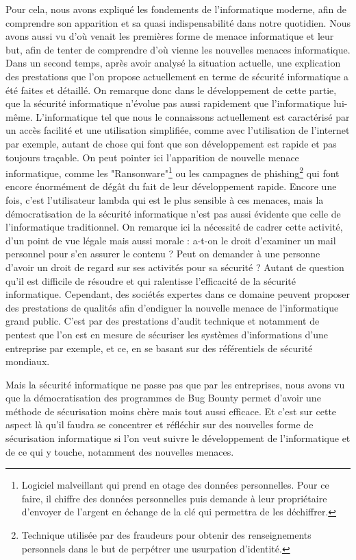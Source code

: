 \documentclass[a4paper]{memoir}
\begin{document}
Pour cela, nous avons expliqué les fondements de l'informatique moderne, afin de comprendre son apparition et sa quasi indispensabilité dans notre quotidien. Nous avons aussi vu d'où venait les premières forme de menace informatique et leur but, afin de tenter de comprendre d'où vienne les nouvelles menaces informatique.
Dans un second temps, après avoir analysé la situation actuelle, une explication des prestations que l'on propose actuellement en terme de sécurité informatique a été faites et détaillé. 
On remarque donc dans le développement de cette partie, que la sécurité informatique n'évolue pas aussi rapidement que l'informatique lui-même. L'informatique tel que nous le connaissons actuellement est caractérisé par un accès facilité et une utilisation simplifiée, comme avec l'utilisation de l'internet par exemple, autant de chose qui font que son développement est rapide et pas toujours traçable. On peut pointer ici l'apparition de nouvelle menace informatique, comme les "Ransonware"\footnote{Logiciel malveillant qui prend en otage des données personnelles. Pour ce faire, il chiffre des données personnelles puis demande à leur propriétaire d'envoyer de l'argent en échange de la clé qui permettra de les déchiffrer.} ou les campagnes de phishing\footnote{Technique utilisée par des fraudeurs pour obtenir des renseignements personnels dans le but de perpétrer une usurpation d'identité. } qui font encore énormément de dégât du fait de leur développement rapide. 
Encore une fois, c'est l'utilisateur lambda qui est le plus sensible à ces menaces, mais la démocratisation de la sécurité informatique n'est pas aussi évidente que celle de l'informatique traditionnel. On remarque ici la nécessité de cadrer cette activité, d'un point de vue légale mais aussi morale : a-t-on le droit d'examiner un mail personnel pour s'en assurer le contenu ? Peut on demander à une personne d'avoir un droit de regard sur ses activités pour sa sécurité ? Autant de question qu'il est difficile de résoudre et qui ralentisse l'efficacité de la sécurité informatique.
Cependant, des sociétés expertes dans ce domaine peuvent proposer des prestations de qualités afin d'endiguer la nouvelle menace de l'informatique grand public. C'est par des prestations d'audit technique et notamment de pentest que l'on est en mesure de sécuriser les systèmes d'informations d'une entreprise par exemple, et ce, en se basant sur des référentiels de sécurité mondiaux.

Mais la sécurité informatique ne passe pas que par les entreprises, nous avons vu que la démocratisation des programmes de Bug Bounty permet d'avoir une méthode de sécurisation moins chère mais tout aussi efficace. Et c'est sur cette aspect là qu'il faudra se concentrer et réfléchir sur des nouvelles forme de sécurisation informatique si l'on veut suivre le développement de l'informatique et de ce qui y touche, notamment des nouvelles menaces.
\end{document}
